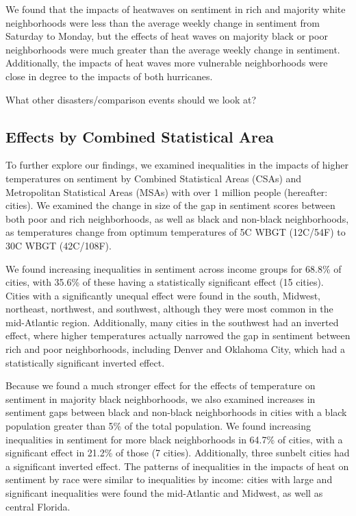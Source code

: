\documentclass{article}
\begin{document}
We found that the impacts of heatwaves on sentiment in rich and majority white neighborhoods were less than the average weekly change in sentiment from Saturday to Monday, but the effects of heat waves on majority black or poor neighborhoods were much greater than the average weekly change in sentiment.  Additionally, the impacts of heat waves more vulnerable neighborhoods were close in degree to the impacts of both hurricanes.

{\color{red} What other disasters/comparison events should we look at?}

\subsection{Effects by Combined Statistical Area}

To further explore our findings, we examined inequalities in the impacts of higher temperatures on sentiment by Combined Statistical Areas (CSAs) and Metropolitan Statistical Areas (MSAs) with over 1 million people (hereafter: cities).  We examined the change in size of the gap in sentiment scores between both poor and rich neighborhoods, as well as black and non-black neighborhoods, as temperatures change from optimum temperatures of 5\textdegree C WBGT (12\textdegree C/54\textdegree F) to 30\textdegree C WBGT (42\textdegree C/108\textdegree F).

We found increasing inequalities in sentiment across income groups for 68.8\% of cities, with 35.6\% of these having a statistically significant effect (15 cities).  Cities with a significantly unequal effect were found in the south, Midwest, northeast, northwest, and southwest, although they were most common in the mid-Atlantic region.  Additionally, many cities in the southwest had an inverted effect, where higher temperatures actually narrowed the gap in sentiment between rich and poor neighborhoods, including Denver and Oklahoma City, which had a statistically significant inverted effect.

Because we found a much stronger effect for the effects of temperature on sentiment in majority black neighborhoods, we also examined increases in sentiment gaps between black and non-black neighborhoods in cities with a black population greater than 5\% of the total population.  We found increasing inequalities in sentiment for more black neighborhoods in 64.7\% of cities, with a significant effect in 21.2\% of those (7 cities).  Additionally, three sunbelt cities had a significant inverted effect.  The patterns of inequalities in the impacts of heat on sentiment by race were similar to inequalities by income: cities with large and significant inequalities were found the mid-Atlantic and Midwest, as well as central Florida.
\end{document}
